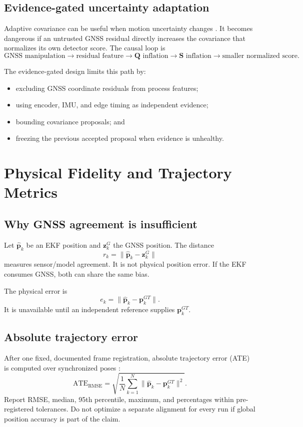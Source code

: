\documentclass[11pt,oneside]{book}
\newcommand{\vect}[1]{\bm{#1}}
\begin{document}
\section{Evidence-gated uncertainty adaptation}

Adaptive covariance can be useful when motion uncertainty changes
\cite{mehra1970}. It becomes dangerous if an untrusted GNSS residual directly
increases the covariance that normalizes its own detector score. The causal
loop is
\[
\text{GNSS manipulation}\rightarrow\text{residual feature}
\rightarrow\vect{Q}\text{ inflation}\rightarrow\vect{S}\text{ inflation}
\rightarrow\text{smaller normalized score}.
\]

The evidence-gated design limits this path by:
\begin{itemize}
  \item excluding GNSS coordinate residuals from process features;
  \item using encoder, IMU, and edge timing as independent evidence;
  \item bounding covariance proposals; and
  \item freezing the previous accepted proposal when evidence is unhealthy.
\end{itemize}

\chapter{Physical Fidelity and Trajectory Metrics}

\section{Why GNSS agreement is insufficient}

Let $\hat{\vect{p}}_k$ be an EKF position and $\vect{z}^{G}_k$ the GNSS
position. The distance
\[
r_k=\|\hat{\vect{p}}_k-\vect{z}^{G}_k\|
\]
measures sensor/model agreement. It is not physical position error. If the EKF
consumes GNSS, both can share the same bias.

The physical error is
\[
e_k=\|\hat{\vect{p}}_k-\vect{p}^{GT}_k\|.
\]
It is unavailable until an independent reference supplies
$\vect{p}^{GT}_k$.

\section{Absolute trajectory error}

After one fixed, documented frame registration, absolute trajectory error
(ATE) is computed over synchronized poses \cite{sturm2012}:
\[
\mathrm{ATE}_{\mathrm{RMSE}}=
\sqrt{\frac{1}{N}\sum_{k=1}^{N}
\|\hat{\vect{p}}_k-\vect{p}^{GT}_k\|^2}.
\]
Report RMSE, median, 95th percentile, maximum, and percentages within
pre-registered tolerances. Do not optimize a separate alignment for every run
if global position accuracy is part of the claim.
\end{document}
